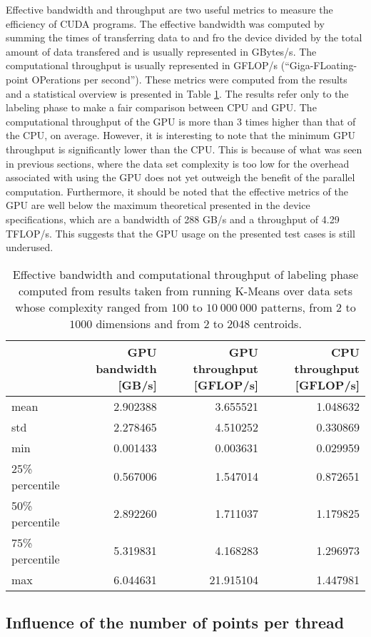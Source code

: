 Effective bandwidth and throughput are two useful metrics to measure the efficiency of CUDA programs.
The effective bandwidth was computed by summing the times of transferring data to and fro the device divided by the total amount of data transfered and is usually represented in GBytes/s.
The computational throughput is usually represented in GFLOP/s (“Giga-FLoating-point OPerations per second”).
These metrics were computed from the results and a statistical overview is presented in Table \ref{tab:kmeans performance metrics}.
The results refer only to the labeling phase to make a fair comparison between CPU and GPU.
The computational throughput of the GPU is more than 3 times higher than that of the CPU, on average.
However, it is interesting to note that the minimum GPU throughput is significantly lower than the CPU.
This is because of what was seen in previous sections, where the data set complexity is too low for the overhead associated with using the GPU does not yet outweigh the benefit of the parallel computation.
Furthermore, it should be noted that the effective metrics of the GPU are well below the maximum theoretical presented in the device specifications, which are a bandwidth of 288 GB/s and a throughput of 4.29 TFLOP/s.
This suggests that the GPU usage on the presented test cases is still underused.

\begin{table}[h]
\centering
\caption{Effective bandwidth and computational throughput of labeling phase computed from results taken from running K-Means over data sets whose complexity ranged from $100$ to $10 \: 000 \: 000$ patterns, from $2$ to $1000$ dimensions and from $2$ to $2048$ centroids.}

\begin{tabular}{lrrr}
\toprule
{} &  GPU bandwidth [GB/s] &  GPU throughput [GFLOP/s] &  CPU throughput [GFLOP/s] \\
\midrule
mean             &         2.902388 &    3.655521 &        1.048632 \\
std              &         2.278465 &    4.510252 &        0.330869 \\
min              &         0.001433 &    0.003631 &        0.029959 \\
25\% percentile &         0.567006 &    1.547014 &        0.872651 \\
50\% percentile  &         2.892260 &    1.711037 &        1.179825 \\
75\% percentile  &         5.319831 &    4.168283 &        1.296973 \\
max             &         6.044631 &   21.915104 &        1.447981 \\
\bottomrule
\end{tabular}

\label{tab:kmeans performance metrics}
\end{table}

\subsection{Influence of the number of points per thread}